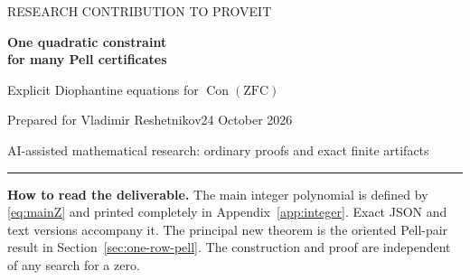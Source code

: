 \documentclass[11pt]{article}
\theoremstyle{remark}\newtheorem{remark}[theorem]{Remark}
\newcommand{\Con}{\operatorname{Con}}
\begin{document}
\thispagestyle{empty}
{\large\color{accent}RESEARCH CONTRIBUTION TO PROVEIT}\par\vspace{8pt}
{\LARGE\bfseries\color{ink}One quadratic constraint\\[3pt]for many Pell certificates}\par\vspace{9pt}
{\large Explicit Diophantine equations for $\Con(\mathrm{ZFC})$}\par\vspace{10pt}
Prepared for Vladimir Reshetnikov\hfill 24 October 2026\par
AI-assisted mathematical research: ordinary proofs and exact finite artifacts
\begin{abstract}
We construct fixed integer-coefficient quartics whose lack of solutions is equivalent in ZFC to syntactic consistency of ZFC, using the repository's named numerical-calculus calibration. The principal unrestricted-integer equation has \IntVars{} variables and \IntRows{} quadratic residuals; its collected polynomial has \IntTerms{} nonzero monomials and coefficient height \IntHeight. A complementary equation in \NatVars{} nonnegative variables has \NatRows{} residuals, \NatTerms{} monomials, and height \NatHeight.

The new arithmetic mechanism combines an upper bound, simultaneous index identification, and orientation of both coordinates of many Pell solutions into one quadratic relation. One separately certified Pell ordinate pays for a sum of squared errors. Reduction modulo the Pell parameter minus one makes those errors small, so the entire sum must vanish. Applied to a direct proof-certificate construction, this combines a shared factorial/binomial value and modular power residues with a single indexed Pell certificate. The route does not simulate K215 or specialize Jones's universal polynomial.

The archive supplies complete residuals, every collected coefficient, source pins, ordinary proofs, deterministic builders, inverse certificates, and independent checks. Claims are relative to the inspected repository and incoming archives. Global minimality, literature-wide priority, consistency itself, and a new end-to-end proof-assistant derivation are not claimed.
\end{abstract}
\vspace{5pt}\hrule\vspace{7pt}
\textbf{How to read the deliverable.} The main integer polynomial is defined by \eqref{eq:mainZ} and printed completely in Appendix~\ref{app:integer}. Exact JSON and text versions accompany it. The principal new theorem is the oriented Pell-pair result in Section~\ref{sec:one-row-pell}. The construction and proof are independent of any search for a zero.
\clearpage
\tableofcontents
\clearpage
\end{document}
